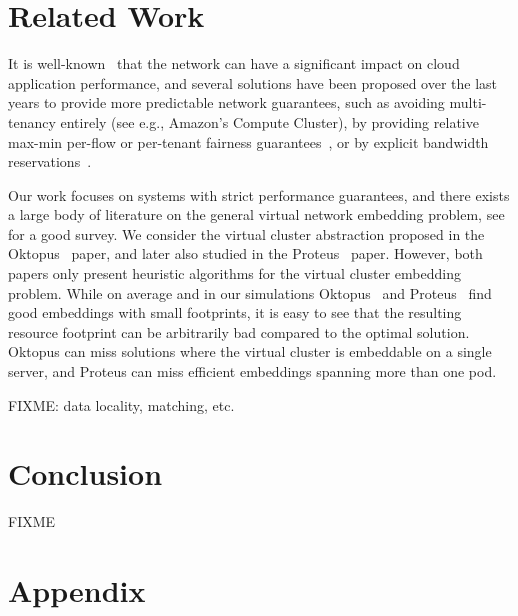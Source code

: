 \documentclass[9pt,twocolumn]{scrartcl}
\begin{document}



\section{Related Work}\label{sec:relwork}

It is well-known~\cite{talk-about} that the network
can have a significant impact on cloud application
performance, and several solutions have been proposed
over the last years to provide more predictable
network guarantees, such as avoiding multi-tenancy
entirely (see e.g., Amazon's Compute Cluster), by providing relative max-min
per-flow or per-tenant fairness
guarantees~\cite{seawall,netshare,faircloud,elasticswitch}, or by
explicit bandwidth
reservations~\cite{gatekeeper,secondnet,oktopus, proteus, drl}.

Our work focuses on systems with strict performance guarantees,
and there exists a large body of literature
on the general virtual network embedding problem, see~\cite{alloc-survey} for a good survey.
We consider the virtual cluster abstraction proposed
in the Oktopus~\cite{oktopus} paper, and later also studied in
the Proteus~\cite{proteus} paper. However, both papers only present
heuristic algorithms for the virtual cluster embedding problem.
While on average and in our simulations Oktopus~\cite{oktopus} and
Proteus~\cite{proteus} find good embeddings with small footprints,
it is easy to see that the resulting resource footprint
can be arbitrarily bad compared to the optimal solution.
Oktopus can miss solutions where the virtual cluster
is embeddable on a single server, and Proteus can miss efficient embeddings
spanning more than one pod.

FIXME: data locality, matching, etc.

\section{Conclusion}\label{sec:conclusion}

FIXME

\section{Appendix}



\end{document}
